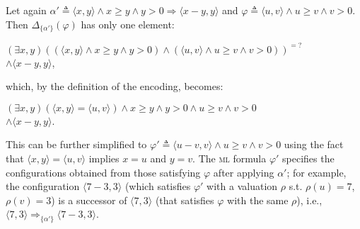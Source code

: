 \documentclass[conference]{IEEEtran}
\newenvironment{todo}{\medskip\hrule\smallskip\noindent}{\smallskip\hrule\medskip}
\newcommand{\dl}[1]{\begin{todo}\textcolor{blue}{Dorel:}\\ \color{red}{#1}\color{black}\end{todo}}
\newcommand{\vr}[1]{\begin{todo}\textcolor{blue}{Vlad:}\\ \color{orange}{#1}\color{black}\end{todo}}
\newcommand{\dl}[1]{}
\newcommand{\vr}[1]{}
\newcommand{\eqbydef}{\triangleq}
\renewcommand{\S}{\mathcal{S}}
\newcommand{\tran}[2]{\Ra^{\!#1}_{\!#2}}
\newcommand{\Ra}{\Rightarrow}
\newcommand{\ML}{\textsc{ml}\xspace}
\newcommand{\rrule}[2]{{#1} \Ra{#2}}
\begin{document}

Let again $\alpha' \eqbydef \rrule{\langle x , y \rangle \land x \geq y \land y > 0}{\langle x - y, y \rangle}$
 and $\varphi \eqbydef \langle u, v \rangle \land u \geq v \land v > 0$.
Then $\Delta_{\{ \alpha' \}}(\varphi)$ has only one element:\vspace{1ex}

\noindent
$(\exists x, y)((\langle x , y \rangle \land x \geq y \land y > 0) \land (\langle u, v \rangle \land u \geq v \land v > 0))^{=?}$\\
\hspace*{7cm}$\land \langle x - y, y \rangle$,

\noindent
which, by the definition of the encoding, becomes:\vspace{1ex}

\noindent
$(\exists x, y) (\langle x , y \rangle = \langle u, v \rangle)  \land x \geq y \land y > 0 \land  u \geq v \land v > 0$\\
\hspace*{7cm}$\land \langle x - y, y \rangle$.\vspace{1ex}

\noindent
This can be further simplified to $\varphi'\eqbydef\langle u - v, v \rangle \land  u \geq v \land v > 0$ using the fact that $\langle x , y \rangle = \langle u, v \rangle$ implies $x = u$ and $y = v$.
The \ML formula $\varphi'$ specifies the configurations obtained from those satisfying $\varphi$ after applying $\alpha'$;
for example, the configuration $\langle 7 - 3, 3 \rangle$ (which satisfies $\varphi'$ with a valuation $\rho$ s.t. $\rho(u)=7$, $\rho(v) = 3$) is a successor of $\langle 7, 3 \rangle$ (that satisfies $\varphi$ with the same $\rho$), i.e.,  $\langle 7, 3 \rangle \tran{}{\{\alpha'\}} \langle 7 - 3, 3 \rangle$.
\end{document}
